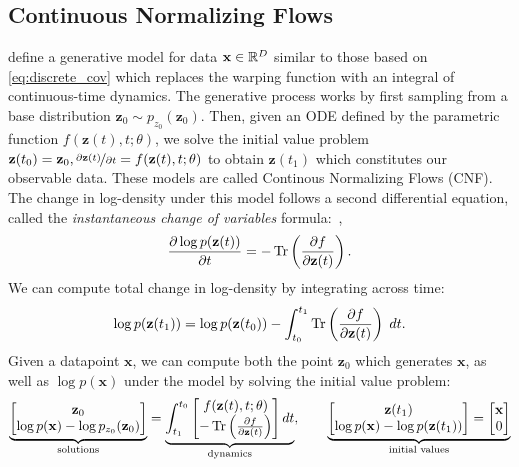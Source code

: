 \documentclass{article} %
\newcommand{\z}{\mathbf{z}}
\newcommand{\x}{\mathbf{x}}
\newcommand{\JTr}{\Tr\left(\frac{\partial f}{\partial \z(t)}\right)}
\newcommand\0{\kern-1.2pt\vec{\kern1.2pt 0}}
\begin{document}
\subsection{Continuous Normalizing Flows}
\citet{chen2018neural} define a generative model for data $\x \in \R^D$ similar to those based on \eqref{eq:discrete_cov} which replaces the warping function with an integral of continuous-time dynamics.
The generative process works by first sampling from a base distribution $\z_0 \sim p_{z_0}(\z_0)$.
Then, given an ODE defined by the parametric function $f(\z(t), t; \theta)$, we solve the initial value problem $\z(t_0) = \z_0, \nicefrac{\partial \z(t)}{\partial t} = f(\z(t), t; \theta)$ to obtain $\z(t_1)$ which constitutes our observable data. 
These models are called Continous Normalizing Flows (CNF).
The change in log-density under this model follows a second differential equation, called the \emph{instantaneous change of variables} formula:~\citep{chen2018neural},
%
\begin{equation}\label{eq:cont-cov}
\frac{\partial \log p(\z(t)) }{\partial t} = -\JTr.
\end{equation}
%
We can compute total change in log-density by integrating across time:
\begin{equation}\label{eq:cont_cov_full}
    \log p(\z(t_1)) = \log p(\z(t_0)) - \int_{t_0}^{t_1} \JTr \;dt.
\end{equation}
%
Given a datapoint $\x$, we can compute both the point $\z_0$ which generates $\x$, as well as $\log p(\x)$ under the model by solving the initial value problem:
\begin{align}\label{eq:reverseivp}
    \underbrace{\begin{bmatrix}
    \z_0 \\ \log p(\x) - \log p_{z_0}(\z_0)
    \end{bmatrix}}_{\textnormal{solutions}} = \underbrace{\int_{t_1}^{t_0}
    \begin{bmatrix}
    f(\z(t), t; \theta) \\ - \JTr
    \end{bmatrix}dt}_{\textnormal{dynamics}},\qquad
    \underbrace{\begin{bmatrix}
    \z(t_1) \\ \log p(\x) - \log p(\z(t_1))
    \end{bmatrix} = 
    \begin{bmatrix}
    \x \\ 0
    \end{bmatrix}}_{\textnormal{initial values}}
\end{align}
\end{document}
